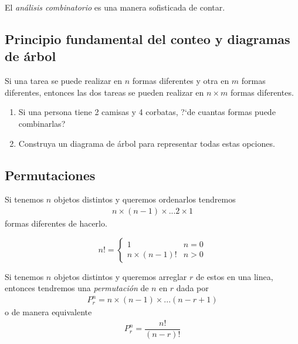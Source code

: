 {}
El \emph{análisis combinatorio} es una manera sofisticada de contar.


\subsection{Principio fundamental del conteo y diagramas de árbol}

Si una tarea se puede realizar en $n$ formas diferentes y otra en $m$ formas diferentes, entonces las dos tareas se pueden realizar en $n\times m$ formas diferentes.


{}
\begin{ejemplo}
 \label{exmp:0.1.14}
\end{ejemplo}
 \begin{enumerate}
  \item Si una persona tiene 2 camisas y 4 corbatas, ?`de cuantas formas puede combinarlas?
  \item Construya un diagrama de árbol para representar todas estas opciones.
 \end{enumerate}



\subsection{Permutaciones}
{}
Si tenemos $n$ objetos distintos y queremos ordenarlos tendremos
\begin{align*}
n \times (n-1) \times ... 2\times 1
\end{align*} formas diferentes de hacerlo.

{}
\begin{defn}[$n$ factorial]
 \begin{equation}
n! = \begin{cases}
     1 & n=0 \\
     n\times(n-1)! & n>0
    \end{cases}
\end{equation}

\end{defn}


{}
 Si tenemos $n$ objetos distintos y queremos arreglar $r$ de estos en una linea, entonces tendremos una \emph{permutación} de $n$ en $r$ dada por
 \begin{align}
  \label{eq:0.1.25}
  P^{n}_{r}=n\times(n-1)\times...\left( n-r+1 \right)
 \end{align} 
o de manera equivalente
\begin{align}
 \label{eq:0.1.27}
 P^{n}_{r}=\dfrac{n!}{(n-r)!}
\end{align}


